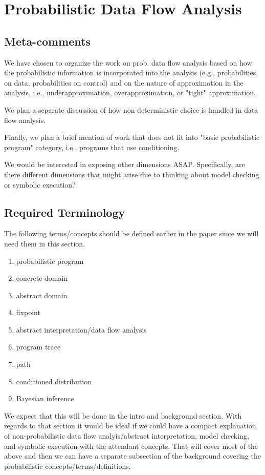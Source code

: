 \section{Probabilistic Data Flow Analysis}

\subsection{Meta-comments}

We have chosen to organize the work on prob. data flow analysis based 
on how the probabilistic information is incorporated into the analysis
(e.g., probabilities on data, probabilities on control)
and on the nature of approximation in the analysis, 
i.e., underapproximation, overapproximation, or "tight" approximation.

We plan a separate discussion of how non-deterministic choice is
handled in data flow analysis.

Finally, we plan a brief mention of work that does not fit into 
"basic probabilistic program" category, i.e., programs that use
conditioning.

We would be interested in exposing other dimensions ASAP.  Specifically,
are there different dimensions that might arise due to thinking about 
model checking or symbolic execution?

\subsection{Required Terminology}

The following terms/concepts should be defined earlier in the paper
since we will need them in this section.

\begin{enumerate}

 \item probabilistic program
 \item concrete domain
 \item abstract domain
 \item fixpoint
 \item abstract interpretation/data flow analysis
 \item program trace
 \item path
 \item conditioned distribution
 \item Bayesian inference

\end{enumerate}

We expect that this will be done in the intro and background section.   With
regards to that section it would be ideal if we could have a compact
explanation of non-probabilistic data flow analyis/abstract interpretation,
model checking, and symbolic execution with the attendant concepts.
That will cover most of the above and then we can have a separate
subsection of the background covering the probabilistic 
concepts/terms/definitions.


